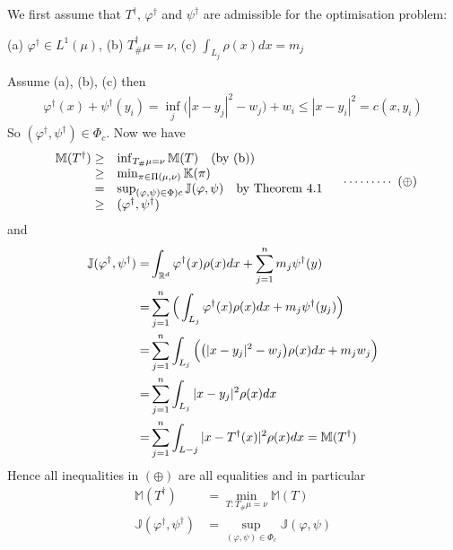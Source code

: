 \documentclass[12pt,a4paper]{article}
\newenvironment{proof}
{\begin{changemargin}{1cm}{0.5cm} 
	}%
	{\end{changemargin}
}
\newenvironment{subproof}
{\begin{changemargin}{0.5cm}{0.5cm} 
	}%
	{\end{changemargin}
}
\newenvironment{p}
{\begin{proof} 
	}%
	{\end{proof}
}
\begin{document}
\begin{p}
\pf We first assume that $T^{\dagger}$, $\varphi^{\dagger}$ and $\psi^{\dagger}$ are admissible for the optimisation problem:
\begin{subproof}
(a) $\varphi^{\dagger} \in L^1(\mu)$, \quad (b) $T^{\dagger}_{\#}\mu = \nu$, \quad (c) $\int_{L_j} \rho(x)dx = m_j$
\end{subproof}
Assume (a), (b), (c) then
\begin{align*}
\varphi^{\dagger} (x) + \psi^{\dagger} (y_i) = \inf_j \big( |x-y_j|^2 - w_j \big) + w_i \leq |x-y_i|^2 = c(x, y_i)
\end{align*}
So $(\varphi^{\dagger}, \psi^{\dagger}) \in \Phi_c$. Now we have
\begin{align*}
\begin{array}{rl}
\mathbb{M}(T^{\dagger}) \geq & \inf_{T_{\#} \mu = \nu} \mathbb{M}(T) \quad (\text{by (b)}) \\
\geq & \min_{\pi \in \Pi(\mu, \nu)} \mathbb{K}(\pi) \\
= & \sup_{(\varphi, \psi)\in \Phi)c} \mathbb{J}(\varphi, \psi) \quad \text{by Theorem 4.1}\\
\geq & \mathbb (\varphi^{\dagger}, \psi^{\dagger}) 
\end{array}  \quad \cdots\cdots\cdots\,\,(\oplus)
\end{align*}
and
\begin{align*}
\mathbb{J} (\varphi^{\dagger}, \psi^{\dagger}) =& \int_{\mathbb{R}^d} \varphi^{\dagger} (x) \rho(x) dx + \sum_{j=1}^n m_j \psi^{\dagger}(y) \\
=& \sum_{j=1}^n \Big( \int_{L_j} \varphi^{\dagger} (x) \rho(x) dx + m_j \psi^{\dagger}(y_j) \Big) \\
=& \sum_{j=1}^n \int_{L_j} \Big( \big( |x-y_j|^2 - w_j \big) \rho(x) dx + m_j w_j \Big) \\
=& \sum_{j=1}^n \int_{L_j} |x- y_j|^2 \rho(x) dx \\
=& \sum_{j=1}^n \int_{L-j} |x- T^{\dagger}(x)|^2 \rho(x) dx = \mathbb{M}(T^{\dagger})
\end{align*}
Hence all inequalities in $(\oplus)$ are all equalities and in particular
\begin{align*}
\mathbb{M}(T^{\dagger}) & =\min_{T: T_{\#} \mu = \nu} \mathbb{M}(T) \\
\mathbb{J}(\varphi^{\dagger}, \psi^{\dagger}) & = \sup_{(\varphi, \psi) \in \Phi_c} \mathbb{J}(\varphi, \psi)
\end{align*}
\s


\end{p}
\end{document}
